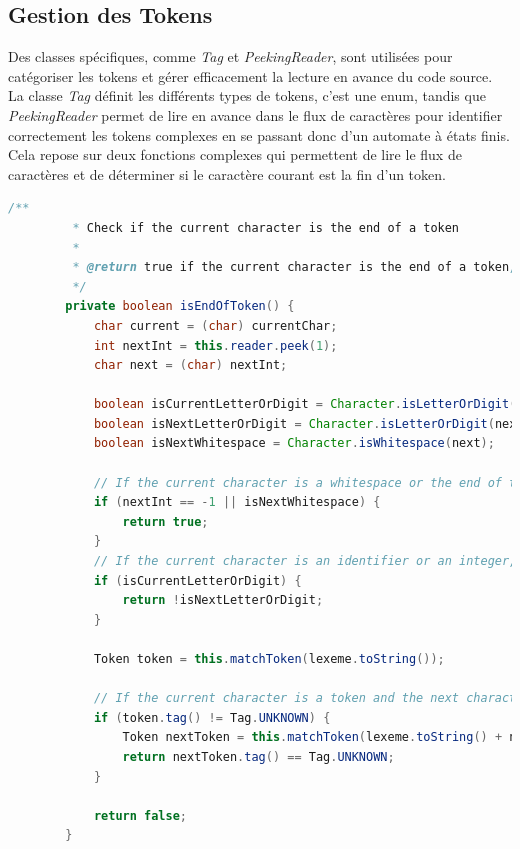 \documentclass[french,a4paper]{article}
\begin{document}
    \subsection{Gestion des Tokens}\label{subsec:gestion-des-tokens}

    Des classes spécifiques, comme \textit{Tag} et \textit{PeekingReader}, sont utilisées pour catégoriser les tokens et gérer efficacement la lecture en avance du code source.
    La classe \textit{Tag} définit les différents types de tokens, c'est une enum, tandis que \textit{PeekingReader} permet de lire en avance dans le flux de caractères pour identifier correctement les tokens complexes en se passant donc d'un automate à états finis.
    Cela repose sur deux fonctions complexes qui permettent de lire le flux de caractères et de déterminer si le caractère courant est la fin d'un token.

    \begin{lstlisting}[language=Java,label={lst:lstlisting1}]
        /**
         * Check if the current character is the end of a token
         *
         * @return true if the current character is the end of a token, false otherwise
         */
        private boolean isEndOfToken() {
            char current = (char) currentChar;
            int nextInt = this.reader.peek(1);
            char next = (char) nextInt;

            boolean isCurrentLetterOrDigit = Character.isLetterOrDigit(current) || current == '_';
            boolean isNextLetterOrDigit = Character.isLetterOrDigit(next) || next == '_';
            boolean isNextWhitespace = Character.isWhitespace(next);

            // If the current character is a whitespace or the end of the file, the current character is the end of the token
            if (nextInt == -1 || isNextWhitespace) {
                return true;
            }
            // If the current character is an identifier or an integer, the next character must not be a letter or a digit
            if (isCurrentLetterOrDigit) {
                return !isNextLetterOrDigit;
            }

            Token token = this.matchToken(lexeme.toString());

            // If the current character is a token and the next character is not a token, the current character is the end of the token
            if (token.tag() != Tag.UNKNOWN) {
                Token nextToken = this.matchToken(lexeme.toString() + next);
                return nextToken.tag() == Tag.UNKNOWN;
            }

            return false;
        }
    \end{lstlisting}
\end{document}
